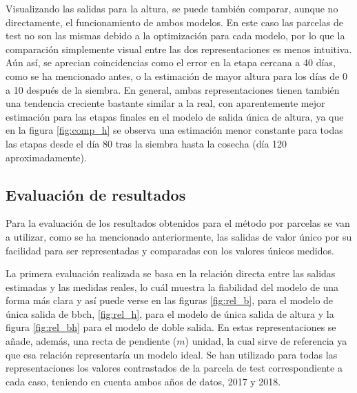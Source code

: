 \par Visualizando las salidas para la altura, se puede también comparar, aunque no directamente, el funcionamiento de ambos modelos. En este caso las parcelas de test no son las mismas debido a la optimización para cada modelo, por lo que la comparación simplemente visual entre las dos representaciones es menos intuitiva. Aún así, se aprecian coincidencias como el error en la etapa cercana a 40 días, como se ha mencionado antes, o la estimación de mayor altura para los días de 0 a 10 después de la siembra. En general, ambas representaciones tienen también una tendencia creciente bastante similar a la real, con aparentemente mejor estimación para las etapas finales en el modelo de salida única de altura, ya que en la figura \ref{fig:comp_h} se observa una estimación menor constante para todas las etapas desde el día 80 tras la siembra hasta la cosecha (día 120 aproximadamente).

\subsection{Evaluación de resultados}
\par Para la evaluación de los resultados obtenidos para el método por parcelas se van a utilizar, como se ha mencionado anteriormente, las salidas de valor único por su facilidad para ser representadas y comparadas con los valores únicos medidos. 
\\
\par La primera evaluación realizada se basa en la relación directa entre las salidas estimadas y las medidas reales, lo cuál muestra la fiabilidad del modelo de una forma más clara y así puede verse en las figuras \ref{fig:rel_b}, para el modelo de única salida de \gls{bbch}, \ref{fig:rel_h}, para el modelo de única salida de altura y la figura \ref{fig:rel_bh} para el modelo de doble salida. En estas representaciones se añade, además, una recta de pendiente ($m$) unidad, la cual sirve de referencia ya que esa relación representaría un modelo ideal. Se han utilizado para todas las representaciones los valores contrastados de la parcela de test correspondiente a cada caso, teniendo en cuenta ambos años de datos, 2017 y 2018.

